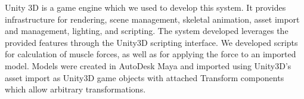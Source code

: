 	Unity 3D is a game engine which we used to develop this system.  It provides infrastructure for rendering, scene management, skeletal animation, asset import and management, lighting, and scripting.  The system developed leverages the provided features through the Unity3D scripting interface.  We developed scripts for calculation of muscle forces, as well as for applying the force to an imported model.  Models were created in AutoDesk Maya and imported using Unity3D's asset import as Unity3D game objects with attached Transform components which allow arbitrary transformations.
